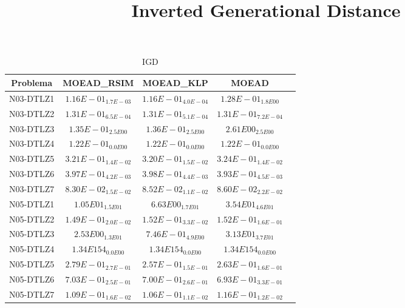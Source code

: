 \documentclass{article}
\title{Inverted Generational Distance}
\author{}
\begin{document}
\maketitle
\begin{table*}[ht!]
\scriptsize
\caption{IGD}
\centering\begin{tabular}{|c||c||c||c||c|} \hline
Problema &MOEAD_RSIM &MOEAD_KLP &MOEAD\\\hline
N03-DTLZ1 &\cellcolor{gray25}$1.16E-01_{1.7E-03}$ &\cellcolor{gray95}$1.16E-01_{4.0E-04}$ &$1.28E-01_{1.8E00}$\\ 
\hline
N03-DTLZ2 &\cellcolor{gray25}$1.31E-01_{6.5E-04}$ &\cellcolor{gray95}$1.31E-01_{5.1E-04}$ &$1.31E-01_{7.2E-04}$\\ 
\hline
N03-DTLZ3 &\cellcolor{gray95}$1.35E-01_{2.5E00}$ &\cellcolor{gray25}$1.36E-01_{2.5E00}$ &$2.61E00_{2.5E00}$\\ 
\hline
N03-DTLZ4 &\cellcolor{gray95}$1.22E-01_{0.0E00}$ &\cellcolor{gray25}$1.22E-01_{0.0E00}$ &$1.22E-01_{0.0E00}$\\ 
\hline
N03-DTLZ5 &\cellcolor{gray25}$3.21E-01_{1.4E-02}$ &\cellcolor{gray95}$3.20E-01_{1.5E-02}$ &$3.24E-01_{1.4E-02}$\\ 
\hline
N03-DTLZ6 &\cellcolor{gray25}$3.97E-01_{4.2E-03}$ &$3.98E-01_{4.4E-03}$ &\cellcolor{gray95}$3.93E-01_{4.5E-03}$\\ 
\hline
N03-DTLZ7 &\cellcolor{gray95}$8.30E-02_{1.5E-02}$ &\cellcolor{gray25}$8.52E-02_{1.1E-02}$ &$8.60E-02_{2.2E-02}$\\ 
\hline
N05-DTLZ1 &\cellcolor{gray25}$1.05E01_{1.5E01}$ &\cellcolor{gray95}$6.63E00_{1.7E01}$ &$3.54E01_{4.6E01}$\\ 
\hline
N05-DTLZ2 &\cellcolor{gray95}$1.49E-01_{2.0E-02}$ &\cellcolor{gray25}$1.52E-01_{3.3E-02}$ &$1.52E-01_{1.6E-01}$\\ 
\hline
N05-DTLZ3 &\cellcolor{gray25}$2.53E00_{1.3E01}$ &\cellcolor{gray95}$7.46E-01_{4.9E00}$ &$3.13E01_{3.7E01}$\\ 
\hline
N05-DTLZ4 &\cellcolor{gray95}$1.34E154_{0.0E00}$ &\cellcolor{gray25}$1.34E154_{0.0E00}$ &$1.34E154_{0.0E00}$\\ 
\hline
N05-DTLZ5 &$2.79E-01_{2.7E-01}$ &\cellcolor{gray95}$2.57E-01_{1.5E-01}$ &\cellcolor{gray25}$2.63E-01_{1.6E-01}$\\ 
\hline
N05-DTLZ6 &$7.03E-01_{2.5E-01}$ &\cellcolor{gray25}$7.00E-01_{2.6E-01}$ &\cellcolor{gray95}$6.93E-01_{3.3E-01}$\\ 
\hline
N05-DTLZ7 &\cellcolor{gray25}$1.09E-01_{1.6E-02}$ &\cellcolor{gray95}$1.06E-01_{1.1E-02}$ &$1.16E-01_{1.2E-02}$\\ 

\end{tabular}
\end{table*}
\end{document}
